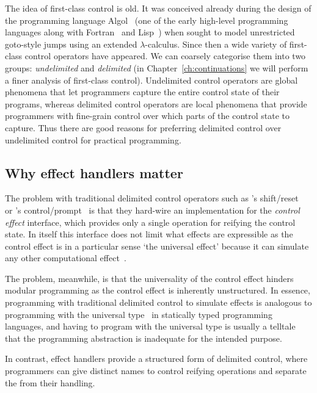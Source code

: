 \documentclass[12pt,phd,lfcs,twoside,openright,logo,leftchapter,normalheadings]{infthesis}
\theoremstyle{plain}
\theoremstyle{definition}
\begin{document}
The idea of first-class control is old. It was conceived already
during the design of the programming language
Algol~\cite{BackusBGKMPRSVWWW60} (one of the early high-level
programming languages along with Fortran~\cite{BackusBBGHHNSSS57} and
Lisp~\cite{McCarthy60}) when \citet{Landin98} sought to model
unrestricted goto-style jumps using an extended $\lambda$-calculus.
%
Since then a wide variety of first-class control operators have
appeared. We can coarsely categorise them into two groups:
\emph{undelimited} and \emph{delimited} (in
Chapter~\ref{ch:continuations} we will perform a finer analysis of
first-class control). Undelimited control operators are global
phenomena that let programmers capture the entire control state of
their programs, whereas delimited control operators are local
phenomena that provide programmers with fine-grain control over which
parts of the control state to capture.
%
Thus there are good reasons for preferring delimited control over
undelimited control for practical programming.

\subsection{Why effect handlers matter}
%
The problem with traditional delimited control operators such as
\citeauthor{DanvyF90}'s shift/reset~\cite{DanvyF90} or
\citeauthor{Felleisen88}'s control/prompt~\cite{Felleisen88} is that
they hard-wire an implementation for the \emph{control effect}
interface, which provides only a single operation for reifying the
control state. In itself this interface does not limit what effects
are expressible as the control effect is in a particular sense `the
universal effect' because it can simulate any other computational
effect~\cite{Filinski96}.

The problem, meanwhile, is that the universality of the control effect
hinders modular programming as the control effect is inherently
unstructured. In essence, programming with traditional delimited
control to simulate effects is analogous to programming with the
universal type~\cite{Longley03} in statically typed programming
languages, and having to program with the universal type is usually a
telltale that the programming abstraction is inadequate for the
intended purpose.

In contrast, effect handlers provide a structured form of delimited
control, where programmers can give distinct names to control reifying
operations and separate the from their handling.
%
\end{document}
